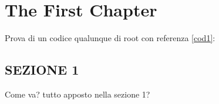 \chapter{The First Chapter}
Prova di un codice qualunque di root con referenza \ref{cod1}:\\


\section{SEZIONE 1}
Come va? tutto apposto nella sezione 1?